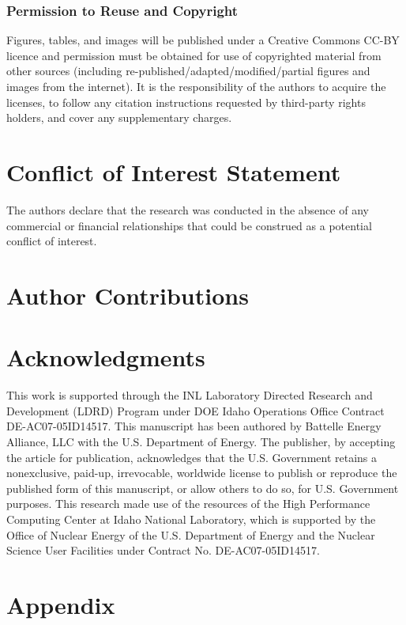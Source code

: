 \documentclass[utf8]{frontiersSCNS} %
\begin{document}
\subsubsection{Permission to Reuse and Copyright}
Figures, tables, and images will be published under a Creative Commons CC-BY licence and permission must be obtained for use of copyrighted material from other sources (including re-published/adapted/modified/partial figures and images from the internet). It is the responsibility of the authors to acquire the licenses, to follow any citation instructions requested by third-party rights holders, and cover any supplementary charges.

\section*{Conflict of Interest Statement}

The authors declare that the research was conducted in the absence of any commercial or financial relationships that could be construed as a potential conflict of interest.

\section*{Author Contributions}


\section*{Acknowledgments}
This work is supported through the INL Laboratory Directed Research and Development (LDRD) Program under DOE Idaho Operations Office Contract DE-AC07-05ID14517. This manuscript has been authored by Battelle Energy Alliance, LLC with the U.S. Department of Energy. The publisher, by accepting the article for publication, acknowledges that the U.S. Government retains a nonexclusive, paid-up, irrevocable, worldwide license to publish or reproduce the published form of this manuscript, or allow others to do so, for U.S. Government purposes. This research made use of the resources of the High Performance Computing Center at Idaho National Laboratory, which is supported by the Office of Nuclear Energy of the U.S. Department of Energy and the Nuclear Science User Facilities under Contract No. DE-AC07-05ID14517. 

\section{Appendix}
\end{document}
